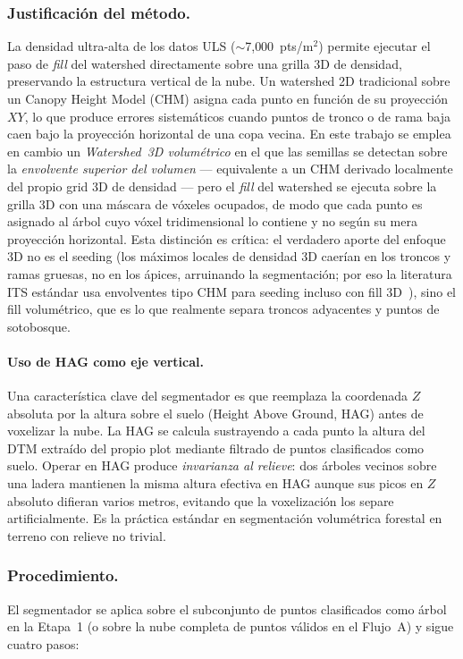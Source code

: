 \documentclass[runningheads]{llncs}
\begin{document}
\subsubsection{Justificaci\'on del m\'etodo.}
La densidad ultra-alta de los datos ULS ($\sim$7{,}000~pts/m$^2$) permite ejecutar el paso de \emph{fill} del watershed directamente sobre una grilla 3D de densidad, preservando la estructura vertical de la nube. Un watershed 2D tradicional sobre un Canopy Height Model (CHM) asigna cada punto en funci\'on de su proyecci\'on $XY$, lo que produce errores sistem\'aticos cuando puntos de tronco o de rama baja caen bajo la proyecci\'on horizontal de una copa vecina. En este trabajo se emplea en cambio un \emph{Watershed~3D volum\'etrico} en el que las semillas se detectan sobre la \emph{envolvente superior del volumen} --- equivalente a un CHM derivado localmente del propio grid 3D de densidad --- pero el \emph{fill} del watershed se ejecuta sobre la grilla 3D con una m\'ascara de v\'oxeles ocupados, de modo que cada punto es asignado al \'arbol cuyo v\'oxel tridimensional lo contiene y no seg\'un su mera proyecci\'on horizontal. Esta distinci\'on es cr\'itica: el verdadero aporte del enfoque 3D no es el seeding (los m\'aximos locales de densidad 3D caer\'ian en los troncos y ramas gruesas, no en los \'apices, arruinando la segmentaci\'on; por eso la literatura ITS est\'andar usa envolventes tipo CHM para seeding incluso con fill 3D~\cite{dalponte2016}), sino el fill volum\'etrico, que es lo que realmente separa troncos adyacentes y puntos de sotobosque.

\paragraph{Uso de HAG como eje vertical.}
Una caracter\'istica clave del segmentador es que reemplaza la coordenada $Z$ absoluta por la altura sobre el suelo (Height Above Ground, HAG) antes de voxelizar la nube. La HAG se calcula sustrayendo a cada punto la altura del DTM extra\'ido del propio plot mediante filtrado de puntos clasificados como suelo. Operar en HAG produce \emph{invarianza al relieve}: dos \'arboles vecinos sobre una ladera mantienen la misma altura efectiva en HAG aunque sus picos en $Z$ absoluto difieran varios metros, evitando que la voxelizaci\'on los separe artificialmente. Es la pr\'actica est\'andar en segmentaci\'on volum\'etrica forestal en terreno con relieve no trivial.

\subsubsection{Procedimiento.}
El segmentador se aplica sobre el subconjunto de puntos clasificados como \'arbol en la Etapa~1 (o sobre la nube completa de puntos v\'alidos en el Flujo~A) y sigue cuatro pasos:
\end{document}
